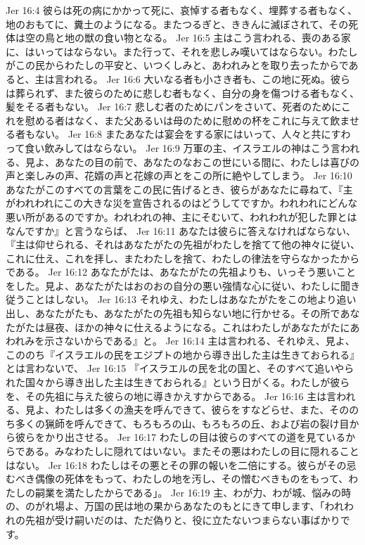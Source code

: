 Jer 16:4  彼らは死の病にかかって死に、哀悼する者もなく、埋葬する者もなく、地のおもてに、糞土のようになる。またつるぎと、ききんに滅ぼされて、その死体は空の鳥と地の獣の食い物となる。
Jer 16:5  主はこう言われる、喪のある家に、はいってはならない。また行って、それを悲しみ嘆いてはならない。わたしがこの民からわたしの平安と、いつくしみと、あわれみとを取り去ったからであると、主は言われる。
Jer 16:6  大いなる者も小さき者も、この地に死ぬ。彼らは葬られず、また彼らのために悲しむ者もなく、自分の身を傷つける者もなく、髪をそる者もない。
Jer 16:7  悲しむ者のためにパンをさいて、死者のためにこれを慰める者はなく、また父あるいは母のために慰めの杯をこれに与えて飲ませる者もない。
Jer 16:8  またあなたは宴会をする家にはいって、人々と共にすわって食い飲みしてはならない。
Jer 16:9  万軍の主、イスラエルの神はこう言われる、見よ、あなたの目の前で、あなたのなおこの世にいる間に、わたしは喜びの声と楽しみの声、花婿の声と花嫁の声とをこの所に絶やしてしまう。
Jer 16:10  あなたがこのすべての言葉をこの民に告げるとき、彼らがあなたに尋ねて、『主がわれわれにこの大きな災を宣告されるのはどうしてですか。われわれにどんな悪い所があるのですか。われわれの神、主にそむいて、われわれが犯した罪とはなんですか』と言うならば、
Jer 16:11  あなたは彼らに答えなければならない、『主は仰せられる、それはあなたがたの先祖がわたしを捨てて他の神々に従い、これに仕え、これを拝し、またわたしを捨て、わたしの律法を守らなかったからである。
Jer 16:12  あなたがたは、あなたがたの先祖よりも、いっそう悪いことをした。見よ、あなたがたはおのおの自分の悪い強情な心に従い、わたしに聞き従うことはしない。
Jer 16:13  それゆえ、わたしはあなたがたをこの地より追い出し、あなたがたも、あなたがたの先祖も知らない地に行かせる。その所であなたがたは昼夜、ほかの神々に仕えるようになる。これはわたしがあなたがたにあわれみを示さないからである』と。
Jer 16:14  主は言われる、それゆえ、見よ、こののち『イスラエルの民をエジプトの地から導き出した主は生きておられる』とは言わないで、
Jer 16:15  『イスラエルの民を北の国と、そのすべて追いやられた国々から導き出した主は生きておられる』という日がくる。わたしが彼らを、その先祖に与えた彼らの地に導きかえすからである。
Jer 16:16  主は言われる、見よ、わたしは多くの漁夫を呼んできて、彼らをすなどらせ、また、そののち多くの猟師を呼んできて、もろもろの山、もろもろの丘、および岩の裂け目から彼らをかり出させる。
Jer 16:17  わたしの目は彼らのすべての道を見ているからである。みなわたしに隠れてはいない。またその悪はわたしの目に隠れることはない。
Jer 16:18  わたしはその悪とその罪の報いを二倍にする。彼らがその忌むべき偶像の死体をもって、わたしの地を汚し、その憎むべきものをもって、わたしの嗣業を満たしたからである」。
Jer 16:19  主、わが力、わが城、悩みの時の、のがれ場よ、万国の民は地の果からあなたのもとにきて申します、「われわれの先祖が受け嗣いだのは、ただ偽りと、役に立たないつまらない事ばかりです。
